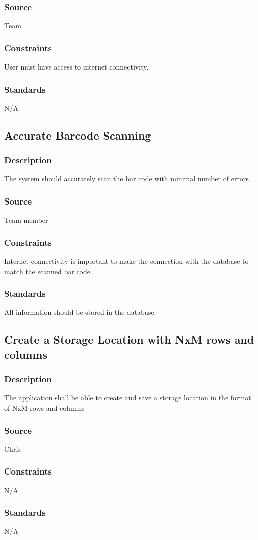 \subsubsection{Source}
Team
\subsubsection{Constraints}
User must have access to internet connectivity. 
\subsubsection{Standards}
N/A



\subsection{Accurate Barcode Scanning}
\subsubsection{Description}
The system should accurately scan the bar code with minimal number of errors.
\subsubsection{Source}
Team member
\subsubsection{Constraints}
Internet connectivity is important to make the connection with the database to match the scanned bar code. 
\subsubsection{Standards}
All information should be stored in the database. 

\subsection{Create a Storage Location with NxM rows and columns}
\subsubsection{Description}
The application shall be able to create and save a storage location in the format of NxM rows and columns 
\subsubsection{Source}
Chris
\subsubsection{Constraints}
N/A
\subsubsection{Standards}
N/A
